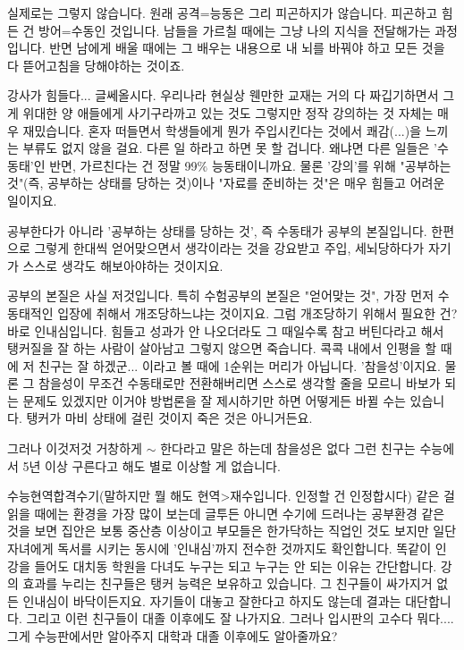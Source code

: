 실제로는 그렇지 않습니다.
원래 공격=능동은 그리 피곤하지가 않습니다. 피곤하고 힘든 건 방어=수동인 것입니다.
남들을 가르칠 때에는 그냥 나의 지식을 전달해가는 과정입니다.
반면 남에게 배울 때에는 그 배우는 내용으로 내 뇌를 바꿔야 하고 모든 것을 다 뜯어고침을 당해야하는 것이죠.
\vspace{5mm}

강사가 힘들다... 글쎄올시다.
우리나라 현실상 웬만한 교재는 거의 다 짜깁기하면서 그게 위대한 양 애들에게 사기구라까고 있는 것도 그렇지만
정작 강의하는 것 자체는 매우 재밌습니다. 혼자 떠들면서 학생들에게 뭔가 주입시킨다는 것에서 쾌감(...)을 느끼는 부류도 없지 않을 걸요.
다른 일 하라고 하면 못 할 겁니다. 왜냐면 다른 일들은 '수동태'인 반면, 가르친다는 건 정말 99$\%$ 능동태이니까요.
물론 '강의'를 위해 "공부하는 것"(즉, 공부하는 상태를 당하는 것)이나 "자료를 준비하는 것"은 매우 힘들고 어려운 일이지요.
\vspace{5mm}

공부한다가 아니라 '공부하는 상태를 당하는 것', 즉 수동태가 공부의 본질입니다.
한편으로 그렇게 한대씩 얻어맞으면서 생각이라는 것을 강요받고 주입, 세뇌당하다가 자기가 스스로 생각도 해보아야하는 것이지요.
\vspace{5mm}

공부의 본질은 사실 저것입니다. 특히 수험공부의 본질은 "얻어맞는 것", 가장 먼저 수동태적인 입장에 취해서 개조당하느냐는 것이지요.
그럼 개조당하기 위해서 필요한 건? 바로 인내심입니다.
힘들고 성과가 안 나오더라도 그 때일수록 참고 버틴다라고 해서 탱커질을 잘 하는 사람이 살아남고 그렇지 않으면 죽습니다.
콕콕 내에서 인평을 할 때에 저 친구는 잘 하겠군... 이라고 볼 때에 1순위는 머리가 아닙니다. '참을성'이지요.
물론 그 참을성이 무조건 수동태로만 전환해버리면 스스로 생각할 줄을 모르니 바보가 되는 문제도 있겠지만
이거야 방법론을 잘 제시하기만 하면 어떻게든 바뀔 수는 있습니다. 탱커가 마비 상태에 걸린 것이지 죽은 것은 아니거든요.
\vspace{5mm}

그러나 이것저것 거창하게 $\sim$ 한다라고 말은 하는데 참을성은 없다
그런 친구는 수능에서 5년 이상 구른다고 해도 별로 이상할 게 없습니다.
\vspace{5mm}

수능현역합격수기(말하지만 뭘 해도 현역>재수입니다. 인정할 건 인정합시다) 같은 걸 읽을 때에는 환경을 가장 많이 보는데
글투든 아니면 수기에 드러나는 공부환경 같은 것을 보면
집안은 보통 중산층 이상이고 부모들은 한가닥하는 직업인 것도 보지만
일단 자녀에게 독서를 시키는 동시에 '인내심'까지 전수한 것까지도 확인합니다.
똑같이 인강을 들어도 대치동 학원을 다녀도 누구는 되고 누구는 안 되는 이유는 간단합니다.
강의 효과를 누리는 친구들은 탱커 능력은 보유하고 있습니다. 그 친구들이 싸가지거 없든 인내심이 바닥이든지요.
자기들이 대놓고 잘한다고 하지도 않는데 결과는 대단합니다. 그리고 이런 친구들이 대졸 이후에도 잘 나가지요.
그러나 입시판의 고수다 뭐다.... 그게 수능판에서만 알아주지 대학과 대졸 이후에도 알아줄까요?
\vspace{5mm}

